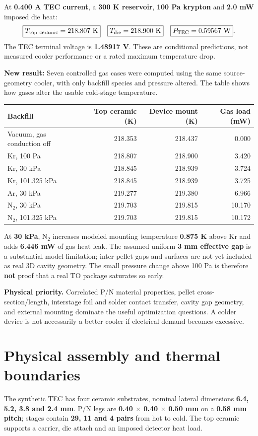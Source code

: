 \documentclass[10pt,a4paper]{article}
\begin{document}
At \textbf{0.400 A TEC current}, a \textbf{300 K reservoir}, \textbf{100 Pa krypton} and \textbf{2.0 mW} imposed die heat:
\[
\boxed{T_{\rm top\ ceramic}=218.807\ {\rm K}}\quad
\boxed{T_{\rm die}=218.900\ {\rm K}}\quad
\boxed{P_{\rm TEC}=0.59567\ {\rm W}}.
\]
The TEC terminal voltage is \textbf{1.48917 V}. These are conditional predictions, not measured cooler performance or a rated maximum temperature drop.

\textbf{New result:} Seven controlled gas cases were computed using the same source-geometry cooler, with only backfill species and pressure altered. The table shows how gases alter the usable cold-stage temperature.
\begin{center}\small
\begin{tabular}{lrrr}\toprule
Backfill & Top ceramic (K) & Device mount (K) & Gas load (mW)\\\midrule
Vacuum, gas conduction off & 218.353 & 218.437 & 0.000\\
Kr, 100 Pa & 218.807 & 218.900 & 3.420\\
Kr, 30 kPa & 218.845 & 218.939 & 3.724\\
Kr, 101.325 kPa & 218.845 & 218.939 & 3.725\\
Ar, 30 kPa & 219.277 & 219.380 & 6.966\\
N$_2$, 30 kPa & 219.703 & 219.815 & 10.170\\
N$_2$, 101.325 kPa & 219.703 & 219.815 & 10.172\\
\bottomrule\end{tabular}
\end{center}
At \textbf{30 kPa}, N$_2$ increases modeled mounting temperature \textbf{0.875 K} above Kr and adds \textbf{6.446 mW} of gas heat leak. The assumed uniform \textbf{3 mm effective gap} is a substantial model limitation; inter-pellet gaps and surfaces are not yet included as real 3D cavity geometry. The small pressure change above 100 Pa is therefore \textbf{not} proof that a real TO package saturates so early.

\textbf{Physical priority.} Correlated P/N material properties, pellet cross-section/length, interstage foil and solder contact transfer, cavity gap geometry, and external mounting dominate the useful optimization questions. A colder device is not necessarily a better cooler if electrical demand becomes excessive.
\clearpage
\tableofcontents\clearpage
\section{Physical assembly and thermal boundaries}
The synthetic TEC has four ceramic substrates, nominal lateral dimensions \textbf{6.4, 5.2, 3.8 and 2.4 mm}. P/N legs are \textbf{0.40 $\times$ 0.40 $\times$ 0.50 mm} on a \textbf{0.58 mm pitch}; stages contain \textbf{29, 11 and 4 pairs} from hot to cold. The top ceramic supports a carrier, die attach and an imposed detector heat load.
\end{document}
